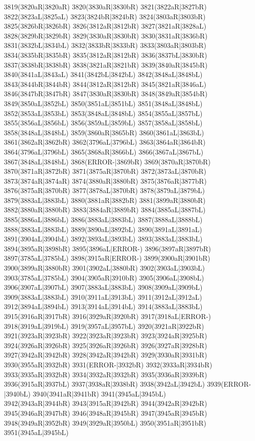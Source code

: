 3819(3820aR|3820aR) 3820(3830aR|3830bR) 3821(3822aR|3827bR) 3822(3823aL|3825aL) 3823(3824bR|3824bR) 3824(3803aR|3803bR) \\3825(3826bR|3826bR) 3826(3812aR|3812bR) 3827(3821aR|3828aL) 3828(3829bR|3829bR) 3829(3830aR|3830bR) 3830(3831aR|3836bR) 3831(3832bL|3834bL) 3832(3833bR|3833bR) 3833(3803aR|3803bR) \\3834(3835bR|3835bR) 3835(3812aR|3812bR) 3836(3837bL|3830bR) 3837(3838bR|3838bR) 3838(3821aR|3821bR) 3839(3840aR|3845bR) 3840(3841aL|3843aL) 3841(3842bL|3842bL) 3842(3848aL|3848bL) \\3843(3844bR|3844bR) 3844(3812aR|3812bR) 3845(3821aR|3846aL) 3846(3847bR|3847bR) 3847(3830aR|3830bR) 3848(3849aR|3854bR) 3849(3850aL|3852bL) 3850(3851aL|3851bL) 3851(3848aL|3848bL) \\3852(3853aL|3853bL) 3853(3848aL|3848bL) 3854(3855aL|3857bL) 3855(3856aL|3856bL) 3856(3859aL|3859bL) 3857(3858aL|3858bL) 3858(3848aL|3848bL) 3859(3860aR|3865bR) 3860(3861aL|3863bL) \\3861(3862aR|3862bR) 3862(3796aL|3796bL) 3863(3864aR|3864bR) 3864(3796aL|3796bL) 3865(3868aR|3866bL) 3866(3867aL|3867bL) 3867(3848aL|3848bL) 3868(ERROR-|3869bR) 3869(3870aR|3870bR) \\3870(3871aR|3872bR) 3871(3875aR|3870bR) 3872(3873aL|3870bR) 3873(3874aR|3874aR) 3874(3880aR|3880bR) 3875(3876aR|3877bR) 3876(3875aR|3870bR) 3877(3878aL|3870bR) 3878(3879aL|3879bL) \\3879(3883aL|3883bL) 3880(3881aR|3882bR) 3881(3899aR|3880bR) 3882(3880aR|3880bR) 3883(3884aR|3889bR) 3884(3885aL|3887bL) 3885(3886aL|3886bL) 3886(3883aL|3883bL) 3887(3888aL|3888bL) \\3888(3883aL|3883bL) 3889(3890aL|3892bL) 3890(3891aL|3891aL) 3891(3904aL|3904bL) 3892(3893aL|3893bL) 3893(3883aL|3883bL) 3894(3895aR|3898bR) 3895(3896aL|ERROR-) 3896(3897aR|3897bR) \\3897(3785aL|3785bL) 3898(3915aR|ERROR-) 3899(3900aR|3901bR) 3900(3899aR|3880bR) 3901(3902aL|3880bR) 3902(3903aL|3903bL) 3903(3785aL|3785bL) 3904(3905aR|3910bR) 3905(3906aL|3908bL) \\3906(3907aL|3907bL) 3907(3883aL|3883bL) 3908(3909aL|3909bL) 3909(3883aL|3883bL) 3910(3911aL|3913bL) 3911(3912aL|3912aL) 3912(3894aL|3894bL) 3913(3914aL|3914bL) 3914(3883aL|3883bL) \\3915(3916aR|3917bR) 3916(3929aR|3920bR) 3917(3918aL|ERROR-) 3918(3919aL|3919bL) 3919(3957aL|3957bL) 3920(3921aR|3922bR) 3921(3923aR|3923bR) 3922(3923aR|3923bR) 3923(3924aR|3925bR) \\3924(3926aR|3926bR) 3925(3926aR|3926bR) 3926(3927aR|3928bR) 3927(3942aR|3942bR) 3928(3942aR|3942bR) 3929(3930aR|3931bR) 3930(3955aR|3932bR) 3931(ERROR-|3932bR) 3932(3933aR|3934bR) \\3933(3935aR|3932bR) 3934(3932aR|3932bR) 3935(3936aR|3939bR) 3936(3915aR|3937bL) 3937(3938aR|3938bR) 3938(3942aL|3942bL) 3939(ERROR-|3940bL) 3940(3941aR|3941bR) 3941(3945aL|3945bL) \\3942(3943aR|3944bR) 3943(3915aR|3942bR) 3944(3942aR|3942bR) 3945(3946aR|3947bR) 3946(3948aR|3945bR) 3947(3945aR|3945bR) 3948(3949aR|3952bR) 3949(3929aR|3950bL) 3950(3951aR|3951bR) \\3951(3945aL|3945bL) 